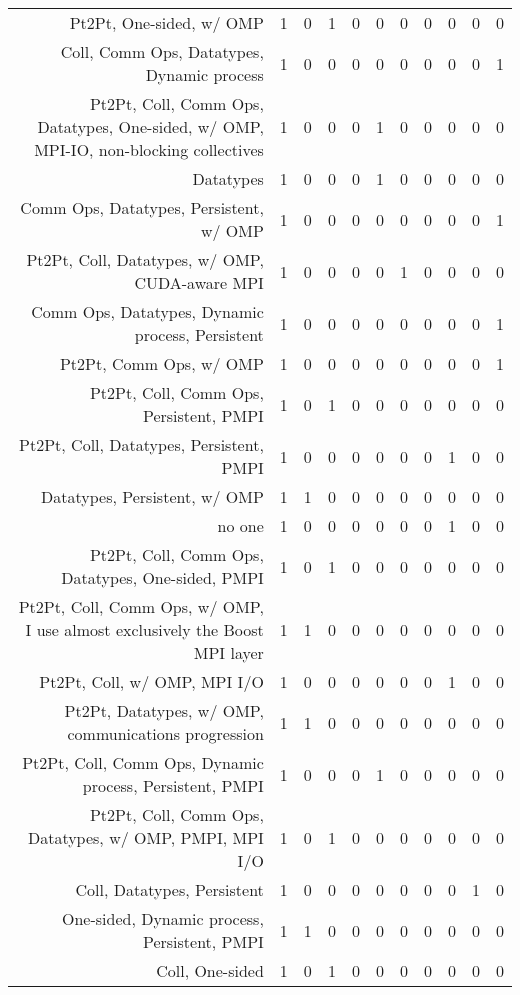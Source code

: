 {\begin{landscape}
\begin{longtable}[htb]{r|c|c|c|c|c|c|c|c|c|c}
{Pt2Pt, One-sided, w/ OMP} & 1 & 0 & 1 & 0 & 0 & 0 & 0 & 0 & 0 & 0 \\%
{Coll, Comm Ops, Datatypes, Dynamic process} & 1 & 0 & 0 & 0 & 0 & 0 & 0 & 0 & 0 & 1 \\%
{Pt2Pt, Coll, Comm Ops, Datatypes, One-sided, w/ OMP, MPI-IO, non-blocking collectives} & 1 & 0 & 0 & 0 & 1 & 0 & 0 & 0 & 0 & 0 \\%
{Datatypes} & 1 & 0 & 0 & 0 & 1 & 0 & 0 & 0 & 0 & 0 \\%
{Comm Ops, Datatypes, Persistent, w/ OMP} & 1 & 0 & 0 & 0 & 0 & 0 & 0 & 0 & 0 & 1 \\%
{Pt2Pt, Coll, Datatypes, w/ OMP, CUDA-aware MPI} & 1 & 0 & 0 & 0 & 0 & 1 & 0 & 0 & 0 & 0 \\%
{Comm Ops, Datatypes, Dynamic process, Persistent} & 1 & 0 & 0 & 0 & 0 & 0 & 0 & 0 & 0 & 1 \\%
{Pt2Pt, Comm Ops, w/ OMP} & 1 & 0 & 0 & 0 & 0 & 0 & 0 & 0 & 0 & 1 \\%
{Pt2Pt, Coll, Comm Ops, Persistent, PMPI} & 1 & 0 & 1 & 0 & 0 & 0 & 0 & 0 & 0 & 0 \\%
{Pt2Pt, Coll, Datatypes, Persistent, PMPI} & 1 & 0 & 0 & 0 & 0 & 0 & 0 & 1 & 0 & 0 \\%
{Datatypes, Persistent, w/ OMP} & 1 & 1 & 0 & 0 & 0 & 0 & 0 & 0 & 0 & 0 \\%
{no one} & 1 & 0 & 0 & 0 & 0 & 0 & 0 & 1 & 0 & 0 \\%
{Pt2Pt, Coll, Comm Ops, Datatypes, One-sided, PMPI} & 1 & 0 & 1 & 0 & 0 & 0 & 0 & 0 & 0 & 0 \\%
{Pt2Pt, Coll, Comm Ops, w/ OMP, I use almost exclusively the Boost MPI layer} & 1 & 1 & 0 & 0 & 0 & 0 & 0 & 0 & 0 & 0 \\%
{Pt2Pt, Coll, w/ OMP, MPI I/O} & 1 & 0 & 0 & 0 & 0 & 0 & 0 & 1 & 0 & 0 \\%
{Pt2Pt, Datatypes, w/ OMP, communications progression} & 1 & 1 & 0 & 0 & 0 & 0 & 0 & 0 & 0 & 0 \\%
{Pt2Pt, Coll, Comm Ops, Dynamic process, Persistent, PMPI} & 1 & 0 & 0 & 0 & 1 & 0 & 0 & 0 & 0 & 0 \\%
{Pt2Pt, Coll, Comm Ops, Datatypes, w/ OMP, PMPI, MPI I/O} & 1 & 0 & 1 & 0 & 0 & 0 & 0 & 0 & 0 & 0 \\%
{Coll, Datatypes, Persistent} & 1 & 0 & 0 & 0 & 0 & 0 & 0 & 0 & 1 & 0 \\%
{One-sided, Dynamic process, Persistent, PMPI} & 1 & 1 & 0 & 0 & 0 & 0 & 0 & 0 & 0 & 0 \\%
{Coll, One-sided} & 1 & 0 & 1 & 0 & 0 & 0 & 0 & 0 & 0 & 0 \\%

\end{longtable}
\end{landscape}}
